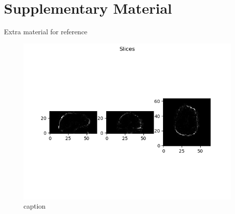 \documentclass[10pt,twocolumn,letterpaper]{article}
\begin{document}
\section{Supplementary Material}\label{sec:supplementary}

Extra material for reference



 \begin{figure}
  \includegraphics[width=\linewidth]{images/var_on_cortex_2.png}
  \caption{caption}
  \label{fig:cortex-var}
\end{figure}
\end{document}
